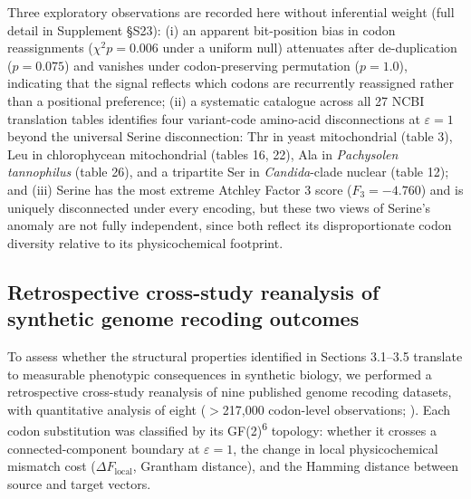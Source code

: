 \documentclass[preprint,11pt,authoryear,a4paper]{elsarticle}
\begin{document}
Three exploratory observations are recorded here without inferential
weight (full detail in Supplement §S23): (i) an apparent bit-position
bias in codon reassignments (\(\chi^{2}p = 0.006\) under a uniform null)
attenuates after de-duplication (\(p = 0.075\)) and vanishes under
codon-preserving permutation (\(p = 1.0\)), indicating that the signal
reflects which codons are recurrently reassigned rather than a
positional preference; (ii) a systematic catalogue across all 27 NCBI
translation tables identifies four variant-code amino-acid
disconnections at \(\varepsilon = 1\) beyond the universal Serine
disconnection: Thr in yeast mitochondrial (table 3), Leu in
chlorophycean mitochondrial (tables 16, 22), Ala in \emph{Pachysolen
tannophilus} (table 26), and a tripartite Ser in \emph{Candida}-clade
nuclear (table 12); and (iii) Serine has the most extreme Atchley Factor
3 score (\(F_{3} = - 4.760\)) and is uniquely disconnected under every
encoding, but these two views of Serine's anomaly are not fully
independent, since both reflect its disproportionate codon diversity
relative to its physicochemical footprint.

\subsection{Retrospective cross-study reanalysis of synthetic genome
recoding outcomes}\label{sec:res-codonsafe}

To assess whether the structural properties identified in Sections
3.1--3.5 translate to measurable phenotypic consequences in synthetic
biology, we performed a retrospective cross-study reanalysis of nine
published genome recoding datasets, with quantitative analysis of eight
(\(>\)217,000 codon-level observations; ).
Each codon substitution was classified by its GF(2)\textsuperscript{6}
topology: whether it crosses a connected-component boundary at
\(\varepsilon = 1\), the change in local physicochemical mismatch cost
(\(\Delta F_{\text{local}}\), Grantham distance), and the Hamming
distance between source and target vectors.
\end{document}
